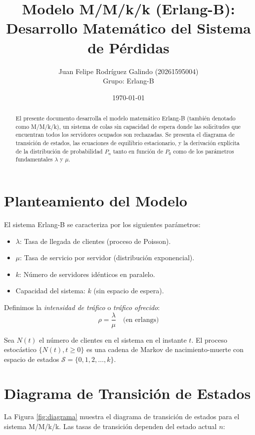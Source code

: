\documentclass[12pt,a4paper]{article}
\title{\textbf{Modelo M/M/k/k (Erlang-B):}\\
Desarrollo Matemático del Sistema de Pérdidas}
\author{Juan Felipe Rodríguez Galindo (20261595004)  \\ Grupo: Erlang-B}
\date{\today}
\theoremstyle{definition}
\begin{document}
\maketitle

\begin{abstract}
El presente documento desarrolla el modelo matemático Erlang-B (también denotado como M/M/k/k), un sistema de colas sin capacidad de espera donde las solicitudes que encuentran todos los servidores ocupados son rechazadas. Se presenta el diagrama de transición de estados, las ecuaciones de equilibrio estacionario, y la derivación explícita de la distribución de probabilidad $P_n$ tanto en función de $P_0$ como de los parámetros fundamentales $\lambda$ y $\mu$.
\end{abstract}

\section{Planteamiento del Modelo}

El sistema Erlang-B se caracteriza por los siguientes parámetros:
\begin{itemize}
    \item $\lambda$: Tasa de llegada de clientes (proceso de Poisson).
    \item $\mu$: Tasa de servicio por servidor (distribución exponencial).
    \item $k$: Número de servidores idénticos en paralelo.
    \item Capacidad del sistema: $k$ (sin espacio de espera).
\end{itemize}

Definimos la \textit{intensidad de tráfico} o \textit{tráfico ofrecido}:
\begin{equation}
    \rho = \frac{\lambda}{\mu} \quad \text{(en erlangs)}
\end{equation}

Sea $N(t)$ el número de clientes en el sistema en el instante $t$. El proceso estocástico $\{N(t), t \geq 0\}$ es una cadena de Markov de nacimiento-muerte con espacio de estados $\mathcal{S} = \{0, 1, 2, \ldots, k\}$.

\section{Diagrama de Transición de Estados}

La Figura \ref{fig:diagrama} muestra el diagrama de transición de estados para el sistema M/M/k/k. Las tasas de transición dependen del estado actual $n$:
\end{document}
